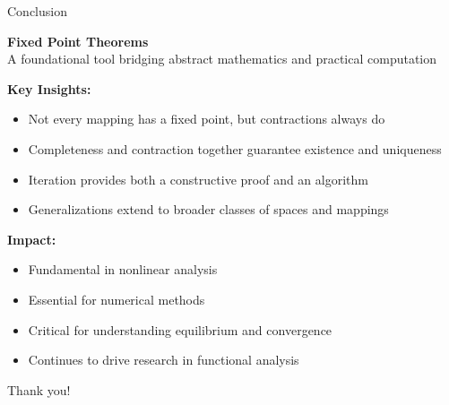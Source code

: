 \documentclass[aspectratio=169,10pt]{beamer}
\begin{document}
\begin{frame}{Conclusion}
    \begin{center}
        {\Large \textbf{Fixed Point Theorems}} \\
        \vspace{0.5cm}
        A foundational tool bridging abstract mathematics and practical computation
    \end{center}

    \vspace{0.5cm}
    \textbf{Key Insights:}
    \begin{itemize}
        \item Not every mapping has a fixed point, but contractions always do
        \item Completeness and contraction together guarantee existence and uniqueness
        \item Iteration provides both a constructive proof and an algorithm
        \item Generalizations extend to broader classes of spaces and mappings
    \end{itemize}

    \vspace{0.5cm}
    \textbf{Impact:}
    \begin{itemize}
        \item Fundamental in nonlinear analysis
        \item Essential for numerical methods
        \item Critical for understanding equilibrium and convergence
        \item Continues to drive research in functional analysis
    \end{itemize}

    \vspace{0.8cm}
    \begin{center}
        {\large Thank you!}
    \end{center}
\end{frame}
\end{document}
